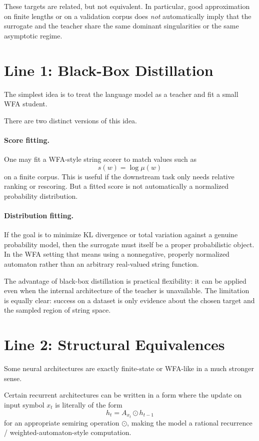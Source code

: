 These targets are related, but not equivalent. In particular, good approximation on finite lengths or on a validation corpus does \emph{not} automatically imply that the surrogate and the teacher share the same dominant singularities or the same asymptotic regime.

\section{Line 1: Black-Box Distillation}

The simplest idea is to treat the language model as a teacher and fit a small WFA student.

There are two distinct versions of this idea.

\paragraph{Score fitting.}
One may fit a WFA-style string scorer to match values such as
\[
  s(w)=\log \mu(w)
\]
on a finite corpus. This is useful if the downstream task only needs relative ranking or rescoring. But a fitted score is not automatically a normalized probability distribution.

\paragraph{Distribution fitting.}
If the goal is to minimize KL divergence or total variation against a genuine probability model, then the surrogate must itself be a proper probabilistic object. In the WFA setting that means using a nonnegative, properly normalized automaton rather than an arbitrary real-valued string function.

The advantage of black-box distillation is practical flexibility: it can be applied even when the internal architecture of the teacher is unavailable. The limitation is equally clear: success on a dataset is only evidence about the chosen target and the sampled region of string space.

\section{Line 2: Structural Equivalences}

Some neural architectures are exactly finite-state or WFA-like in a much stronger sense.

\begin{theorem}
Certain recurrent architectures can be written in a form where the update on input symbol $x_t$ is literally of the form
\[
  h_t = A_{x_t} \odot h_{t-1}
\]
for an appropriate semiring operation $\odot$, making the model a rational recurrence / weighted-automaton-style computation.
\end{theorem}

